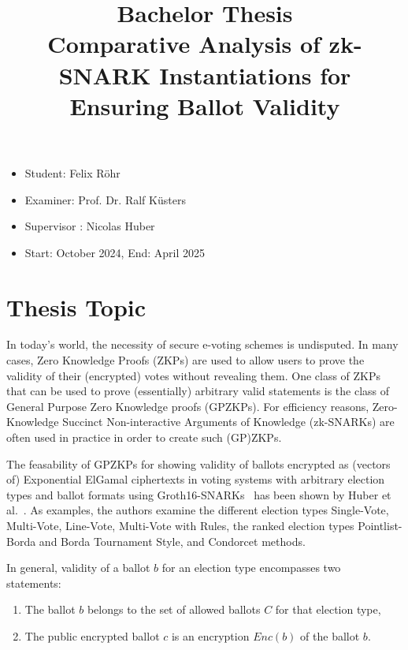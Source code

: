 \documentclass[12pt]{article}
\title{{\small Bachelor Thesis}\\ Comparative Analysis of zk-SNARK Instantiations for Ensuring Ballot Validity}
\begin{document}
\maketitle

\begin{itemize}
    \item Student: Felix Röhr
    \item Examiner: Prof. Dr. Ralf Küsters
    \item Supervisor : Nicolas Huber
    \item Start: October 2024, End: April 2025
\end{itemize}

\section{Thesis Topic}
In today's world, the necessity of secure e-voting schemes is undisputed. 
In many cases, Zero Knowledge Proofs (ZKPs) are used to allow users to prove the validity of their (encrypted) votes without revealing them. 
One class of ZKPs that can be used to prove (essentially) arbitrary valid statements is the class of General Purpose Zero Knowledge proofs (GPZKPs). 
For efficiency reasons, Zero-Knowledge Succinct Non-interactive Arguments of Knowledge (zk-SNARKs) are often used in practice in order to create such (GP)ZKPs.

The feasability of GPZKPs for showing validity of ballots encrypted as (vectors of) Exponential ElGamal ciphertexts in voting systems with arbitrary election types and ballot formats using Groth16-SNARKs~\cite{Groth16} has been shown by Huber et al.~\cite{BallotValidity, Kryvos}.
As examples, the authors examine the different election types Single-Vote, Multi-Vote, Line-Vote, Multi-Vote with Rules, the ranked election types Pointlist-Borda and Borda Tournament Style, and Condorcet methods.

\noindent In general, validity of a ballot $b$ for an election type encompasses two statements:\
\begin{enumerate}[label=(\roman*)]
\item The ballot $b$ belongs to the set of allowed ballots $C$ for that election type, 
\item The public encrypted ballot $c$ is an encryption $Enc(b)$ of the ballot $b$. 
\end{enumerate}
\end{document}
